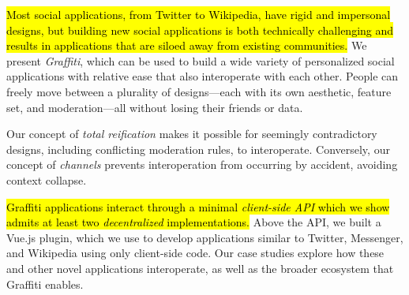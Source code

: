 



{\hl{%
Most social applications, from Twitter to Wikipedia,
have rigid and impersonal designs, but building new social applications
is both technically challenging and results in
applications that are siloed away from existing communities.
}}%
We present \emph{Graffiti}, which can be used
to build a wide variety of personalized social applications
with relative ease that also interoperate with each other. People can freely move between
a plurality of designs---each with its own aesthetic, feature set,
and moderation---all without losing their friends or data.

Our concept of \emph{total reification} makes it possible
for seemingly contradictory designs, including conflicting
moderation rules, to interoperate.
Conversely, our concept of \emph{channels}
prevents interoperation from occurring by accident, avoiding context collapse.


{\hl{%
Graffiti applications interact through a minimal \emph{client-side API}
which we show admits at least two \emph{decentralized} implementations.
}}%
Above the API, we built a Vue.js plugin, which we use to
develop applications similar to Twitter, Messenger, and Wikipedia
using only client-side code.
Our case studies explore how these and other novel applications interoperate,
as well as the broader ecosystem that Graffiti enables.
